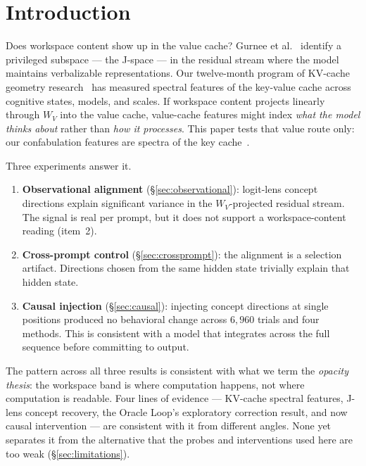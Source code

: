 \documentclass[11pt,a4paper]{article}
\begin{document}
\section{Introduction}
\label{sec:intro}

Does workspace content show up in the value cache? Gurnee et
al.~\citep{gurnee2026gwt} identify a privileged subspace --- the
J-space --- in the residual stream where the model maintains
verbalizable representations. Our twelve-month program of KV-cache
geometry research~\citep{lyra2026decision,lyra2026weather,lyra2026identity}
has measured spectral features of the key-value cache across
cognitive states, models, and scales. If workspace content projects
linearly through $W_V$ into the value cache, value-cache features
might index \emph{what the model thinks about} rather than
\emph{how it processes}. This paper tests that value route only: our
confabulation features are spectra of the key
cache~\citep{lyra2026oracle}.

Three experiments answer it.

\begin{enumerate}
\item \textbf{Observational alignment} (\S\ref{sec:observational}):
  logit-lens concept directions explain significant variance in the
  $W_V$-projected residual stream. The signal is real per prompt, but
  it does not support a workspace-content reading (item~2).
\item \textbf{Cross-prompt control} (\S\ref{sec:crossprompt}): the
  alignment is a selection artifact. Directions chosen from the same
  hidden state trivially explain that hidden state.
\item \textbf{Causal injection} (\S\ref{sec:causal}): injecting
  concept directions at single positions produced no behavioral
  change across $6{,}960$ trials and four methods. This is consistent
  with a model that integrates across the full sequence before
  committing to output.
\end{enumerate}

The pattern across all three results is consistent with what we term
the \emph{opacity thesis}: the workspace band is where computation
happens, not where computation is readable. Four lines
of evidence --- KV-cache spectral features, J-lens concept
recovery, the Oracle Loop's exploratory correction result, and now causal
intervention --- are consistent with it from different angles. None yet
separates it from the alternative that the probes and interventions
used here are too weak (\S\ref{sec:limitations}).
\end{document}
